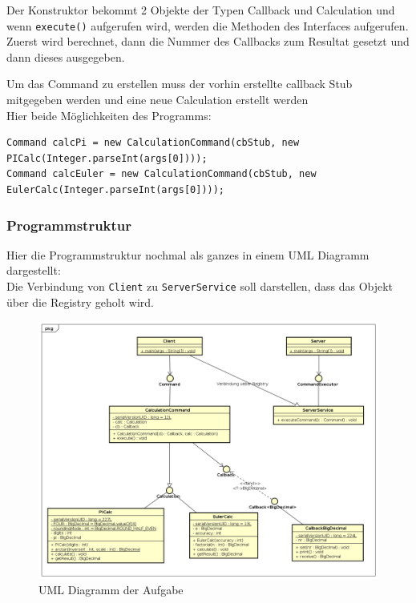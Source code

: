 Der Konstruktor bekommt 2 Objekte der Typen Callback und Calculation und wenn \texttt{execute()} aufgerufen wird, werden die Methoden des Interfaces aufgerufen.
Zuerst wird berechnet, dann die Nummer des Callbacks zum Resultat gesetzt und dann dieses ausgegeben.

Um das Command zu erstellen muss der vorhin erstellte callback Stub mitgegeben werden und eine neue Calculation erstellt werden\\
Hier beide M\"oglichkeiten des Programms:

\begin{lstlisting}[style=Java, caption=Command Erstellung]
Command calcPi = new CalculationCommand(cbStub, new PICalc(Integer.parseInt(args[0])));
Command calcEuler = new CalculationCommand(cbStub, new EulerCalc(Integer.parseInt(args[0])));
\end{lstlisting}

\subsubsection{Programmstruktur}

Hier die Programmstruktur nochmal als ganzes in einem UML Diagramm dargestellt:\\
Die Verbindung von \texttt{Client} zu \texttt{ServerService} soll darstellen, dass das Objekt \"uber die Registry geholt wird.

\begin{figure}[!h]
        \begin{center}
                \includegraphics[width=\linewidth]{images/commandPatternUML.png}
                \caption{UML Diagramm der Aufgabe}
        \end{center}
\end{figure}

